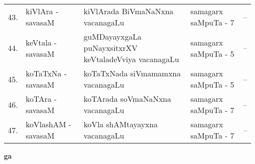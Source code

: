 {\begin{longtable}[l]{@{\qquad~}rl>{\raggedright}p{5.5cm}lc}
43. &  kiVlAra - savasaM & kiVlArada BiVmaNaNxna vacanagaLu & samagarx saMpuTa - 7 & --\\
44. &  keVtala - savasaM & guMDayayxgaLa puNayxsitxrXV keVtaladeVviya\newline \phantom{AA} vacanagaLu & samagarx saMpuTa - 5 & --\\
45. &  koTaTxNa - savasaM & koTaTxNada siVmamamxna vacanagaLu & samagarx saMpuTa - 5 & --\\
46. &  koTAra - savasaM & koTArada soVmaNaNxna vacanagaLu & samagarx saMpuTa - 7 & --\\
47. &  koVlashAM - savasaM & koVla shAMtayayxna vacanagaLu & samagarx saMpuTa - 7 & --\\
\end{longtable}}
\medskip

\centerline{\bf ga}
\medskip

